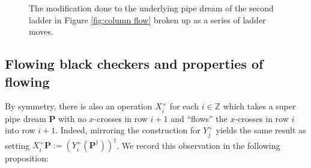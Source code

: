 \documentclass[11pt,reqno]{amsart} %
\makeatletter
\newcommand{\bbZ}{\mathbb{Z}}
\newcommand{\bfP}{\mathbf{P}}
\newenvironment{shift}[1][(0,0)]{
    \begin{scope}[shift={#1}]
}{
    \end{scope}
}
\theoremstyle{definition}
\newcommand{\drawSquare}[3][black,opacity=0.5]{
    \draw[#1,thin]
    (#2-0.5,#3+0.5) rectangle (#2+0.5,#3-0.5);
}
\newcommand{\drawGraySquare}[3][gray,opacity=0.3]{
    \filldraw[#1,thin]
    (#2-0.5,#3+0.5) rectangle (#2+0.5,#3-0.5);
}
\newcommand{\checkerradius}{0.38}
\newcommand{\drawXChecker}[2]{
    \fill[color=x color 2] (#1,#2) circle (\checkerradius);
    \fill[
        color=x color 1,
        pattern color=x color 1,
        pattern={Lines[distance=2pt]},
        thick
    ] (#1,#2) circle (\checkerradius);
    \draw[color=x color 1,thick] (#1,#2) circle (\checkerradius);
}
\newcommand{\drawYChecker}[2]{
    \fill[color=y color 2] (#1,#2) circle (\checkerradius);
    \fill[
        color=y color 1,
        pattern color=y color 1,
        pattern={Lines[distance=1.5pt,angle=90]},
    ] (#1,#2) circle (\checkerradius);
    \draw[color=y color 1, thick] (#1,#2) circle (\checkerradius);
}
\newcommand{\drawXYChecker}[2]{
    \drawXChecker{#1}{#2}
    \drawYChecker{#1-0.1}{#2+0.1}
}
\newcommand{\drawRCGraphTile}[3]{

    \ifnum #3=0 \fi %
    \ifnum #3=1 \drawXChecker{#1}{#2} \fi
    \ifnum #3=2 \drawYChecker{#1}{#2} \fi
    \ifnum #3=3 \drawXYChecker{#1}{#2} \fi
    \ifnum #3=4 \drawGraySquare{#1}{#2}\drawXChecker{#1}{#2} \fi
    \ifnum #3=5 \drawGraySquare{#1}{#2}\drawYChecker{#1}{#2} \fi
    \ifnum #3=6 \fi
    \ifnum #3=7 \fi
    \ifnum #3=8 \fi
    \ifnum #3=9 \drawGraySquare{#1}{#2} \fi
}
\newcommand{\drawRCGraph}[3]{
    \PD@i = 1
    \PD@j = 1
    \foreach \t in {#3}{
        \drawRCGraphTile{\number\PD@j}{-\number\PD@i}{\t}
        \drawSquare{\number\PD@j}{-\number\PD@i}
        
        \ifnum\PD@j < \numexpr#2\relax
            \global\advance\PD@j by 1
        \else
            \global\PD@j = 1
            \global\advance\PD@i by 1
        \fi
    }
}
\makeatother
\begin{document}
\begin{figure}

\caption{
    The modification done to the underlying pipe dream of the second ladder in Figure \ref{fig:column flow} broken up as a series of ladder moves.
}
\label{fig:column flow in ladders}
\end{figure}

\subsection{Flowing black checkers and properties of flowing}
\label{subsect:flow properties}

By symmetry, there is also an operation $X^+_i$ for each $i\in \bbZ$ which takes a super pipe dream $\bfP$ with no $x$-crosses in row $i+1$ and ``flows'' the $x$-crosses in row $i$ into row $i+1$.
Indeed, mirroring the construction for $Y^+_j$ yields the same result as setting $X^+_i\bfP := (Y^+_i(\bfP^\dagger))^\dagger$.
We record this observation in the following proposition:
\end{document}

